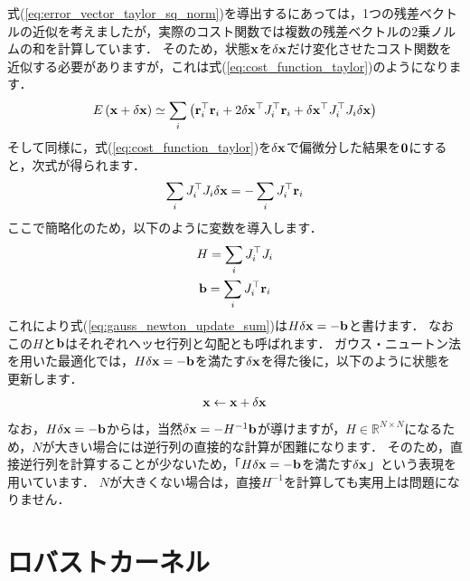 式(\ref{eq:error_vector_taylor_sq_norm})を導出するにあっては，1つの残差ベクトルの近似を考えましたが，実際のコスト関数では複数の残差ベクトルの2乗ノルムの和を計算しています．
そのため，状態${\bf x}$を$\delta {\bf x}$だけ変化させたコスト関数を近似する必要がありますが，これは式(\ref{eq:cost_function_taylor})のようになります．
%
\begin{align}
  E \left( {\bf x} + \delta {\bf x} \right) \simeq \sum_{i} \left( {\bf r}_{i}^{\top} {\bf r}_{i} + 2 \delta {\bf x}^{\top} J_{i}^{\top} {\bf r}_{i} + \delta {\bf x}^{\top} J_{i}^{\top} J_{i} \delta {\bf x} \right)
  \label{eq:cost_function_taylor}
\end{align}
%
そして同様に，式(\ref{eq:cost_function_taylor})を$\delta {\bf x}$で偏微分した結果を${\bf 0}$にすると，次式が得られます．
%
\begin{align}
  \sum_{i} J_{i}^{\top} J_{i} \delta {\bf x} = -\sum_{i} J_{i}^{\top} {\bf r}_{i}
  \label{eq:gauss_newton_update_sum}
\end{align}
%
ここで簡略化のため，以下のように変数を導入します．
%
\begin{align}
  \begin{gathered}
    H = \sum_{i} J_{i}^{\top} J_{i} \\
    {\bf b} = \sum_{i} J_{i}^{\top} {\bf r}_{i}
  \end{gathered}
  \label{eq:hessian_and_gradient_gauss_newton}
\end{align}
%
これにより式(\ref{eq:gauss_newton_update_sum})は$H \delta {\bf x} = -{\bf b}$と書けます．
なおこの$H$と${\bf b}$はそれぞれヘッセ行列と勾配とも呼ばれます．
ガウス・ニュートン法を用いた最適化では，$H \delta {\bf x} = -{\bf b}$を満たす$\delta {\bf x}$を得た後に，以下のように状態を更新します．
%
\begin{align}
  {\bf x} \leftarrow {\bf x} + \delta {\bf x}
  \label{eq:gauss_newton_update_vector}
\end{align}
%
なお，$H \delta {\bf x} = -{\bf b}$からは，当然$\delta {\bf x} = -H^{-1} {\bf b}$が導けますが，$H \in \mathbb{R}^{N \times N}$になるため，$N$が大きい場合には逆行列の直接的な計算が困難になります．
そのため，直接逆行列を計算することが少ないため，「$H \delta {\bf x} = -{\bf b}$を満たす$\delta {\bf x}$」という表現を用いています．
$N$が大きくない場合は，直接$H^{-1}$を計算しても実用上は問題になりません．









\section{ロバストカーネル}

